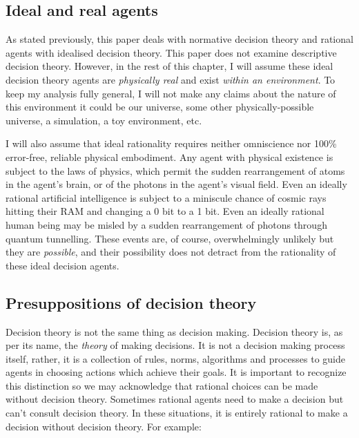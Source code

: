 \documentclass{article}
\begin{document}
\subsection{Ideal and real agents}

As stated previously, this paper deals with normative decision theory and rational agents with idealised decision theory. This paper does not examine descriptive decision theory. However, in the rest of this chapter, I will assume these ideal decision theory agents are \textit{physically real} and exist \textit{within an environment}. To keep my analysis fully general, I will not make any claims about the nature of this environment \textemdash{} it could be our universe, some other physically-possible universe, a simulation, a toy environment, etc.

I will also assume that ideal rationality requires neither omniscience nor 100\% error-free, reliable physical embodiment. Any agent with physical existence is subject to the laws of physics, which permit the sudden rearrangement of atoms in the agent's brain, or of the photons in the agent's visual field. Even an ideally rational artificial intelligence is subject to a miniscule chance of cosmic rays hitting their RAM and changing a 0 bit to a 1 bit. Even an ideally rational human being may be misled by a sudden rearrangement of photons through quantum tunnelling. These events are, of course, overwhelmingly unlikely \textemdash{} but they are \textit{possible}, and their possibility does not detract from the rationality of these ideal decision agents.

\subsection{Presuppositions of decision theory}

Decision theory is not the same thing as decision making. Decision theory is, as per its name, the \textit{theory} of making decisions. It is not a decision making process itself, rather, it is a collection of rules, norms, algorithms and processes to guide agents in choosing actions which achieve their goals. It is important to recognize this distinction so we may acknowledge that rational choices can be made without decision theory. Sometimes rational agents need to make a decision but can't consult decision theory. In these situations, it is entirely rational to make a decision without decision theory. For example:
\end{document}
